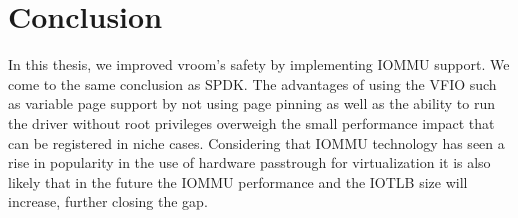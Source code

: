 \chapter{Conclusion}

In this thesis, we improved vroom's safety by implementing IOMMU support. We come to the same conclusion as SPDK. The advantages of using the VFIO such as variable page support by not using page pinning as well as the ability to run the driver without root privileges overweigh the small performance impact that can be registered in niche cases. Considering that IOMMU technology has seen a rise in popularity in the use of hardware passtrough for virtualization it is also likely that in the future the IOMMU performance and the IOTLB size will increase, further closing the gap.
